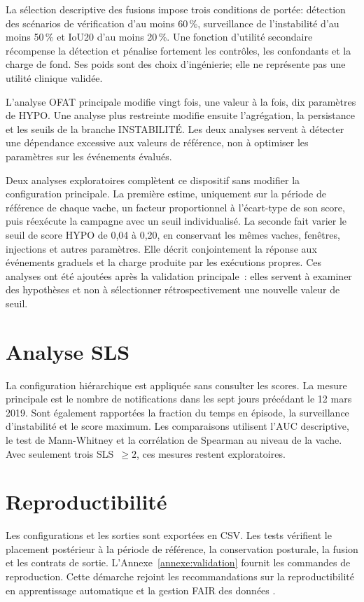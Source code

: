 La sélection descriptive des fusions impose trois conditions de portée: détection
des scénarios de vérification d'au moins 60\,\%, surveillance de l'instabilité d'au moins 50\,\% et
IoU20 d'au moins 20\,\%. Une fonction d'utilité secondaire récompense la détection et
pénalise fortement les contrôles, les confondants et la charge de fond. Ses poids sont des
choix d'ingénierie; elle ne représente pas une utilité clinique validée.

L'analyse OFAT principale modifie vingt fois, une valeur à la fois, dix paramètres de HYPO.
Une analyse plus restreinte modifie ensuite l'agrégation, la persistance et les seuils de la
branche INSTABILITÉ. Les deux analyses servent à détecter une dépendance excessive aux
valeurs de référence, non à optimiser les paramètres sur les événements évalués.

Deux analyses exploratoires complètent ce dispositif sans modifier la configuration
principale. La première estime, uniquement sur la période de référence de chaque vache, un facteur
proportionnel à l'écart-type de son score, puis réexécute la campagne avec un seuil
individualisé. La seconde fait varier le seuil de score HYPO de 0,04 à 0,20, en conservant
les mêmes vaches, fenêtres, injections et autres paramètres. Elle décrit conjointement la
réponse aux événements graduels et la charge produite par les exécutions propres. Ces
analyses ont été ajoutées après la validation principale~: elles servent à examiner des
hypothèses et non à sélectionner rétrospectivement une nouvelle valeur de seuil.

\section{Analyse SLS}

La configuration hiérarchique est appliquée sans consulter les scores. La mesure principale
est le nombre de notifications dans les sept jours précédant le 12 mars 2019. Sont également
rapportées la fraction du temps en épisode, la surveillance d'instabilité et le score
maximum. Les comparaisons utilisent l'AUC descriptive, le test de Mann-Whitney et la
corrélation de Spearman au niveau de la vache. Avec seulement trois SLS~$\geq2$, ces mesures
restent exploratoires.

\section{Reproductibilité}

Les configurations et les sorties sont exportées en CSV. Les tests vérifient le placement
postérieur à la période de référence, la conservation posturale, la fusion et les contrats
de sortie. L'Annexe~\ref{annexe:validation} fournit les commandes de reproduction. Cette
démarche rejoint les recommandations sur la reproductibilité en apprentissage automatique et
la gestion FAIR des données \citep{pineau2021improving,wilkinson2016fair}.
